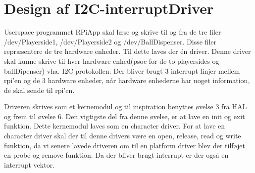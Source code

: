 \documentclass[Softwaredesign/Softwaredesign_main.tex]{subfiles}
\begin{document}
\section{Design af I2C-interruptDriver}
Userspace programmet RPiApp skal læse og skrive til og fra de tre filer /dev/Playerside1, /dev/Playerside2 og /dev/BallDispenser. Disse filer repræsentere de tre hardware enheder. Til dette laves der én driver. Denne driver skal kunne skrive til hver hardware enhed(psoc for de to playersides og ballDipenser) vha. I2C protokollen. Der bliver brugt 3 interrupt linjer mellem rpi'en og de 3 hardware enheder, når hardware enhederne har noget information, de skal sende til rpi'en. 

Driveren skrives som et kernemodul og til inspiration benyttes øvelse 3 fra HAL og frem til øvelse 6. Den vigtigste del fra denne øvelse, er at lave en init og exit funktion. Dette kernemodul laves som en character driver. For at lave en character driver skal der til denne drivers være en open, release, read og write funktion, da vi senere lavede driveren om til en platform driver blev der tilføjet en probe og remove funktion. Da der bliver brugt interrupt er der også en interrupt vektor.
\end{document}
